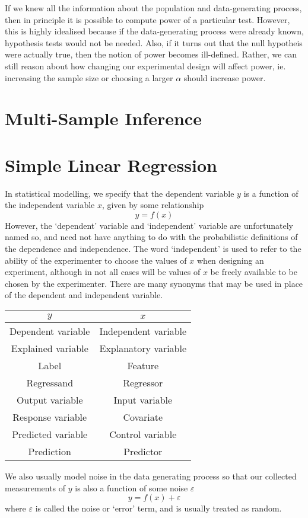 \documentclass[11pt]{report} %
\begin{document}
If we knew all the information about the population and data-generating process, then in principle it is possible to compute power of a particular test. However, this is highly idealised because if the data-generating process were already known, hypothesis tests would not be needed. Also, if it turns out that the null hypotheis were actually true, then the notion of power becomes ill-defined. Rather, we can still reason about how changing our experimental design will affect power, ie. increasing the sample size or choosing a larger $\alpha$ should increase power.

\section{Multi-Sample Inference}

\section{Simple Linear Regression}

In statistical modelling, we specify that the dependent variable $y$ is a function of the independent variable $x$, given by some relationship
\begin{equation}
y = f\left(x\right)
\end{equation}
However, the `dependent' variable and `independent' variable are unfortunately named so, and need not have anything to do with the probabilistic definitions of the dependence and independence. The word `independent' is used to refer to the ability of the experimenter to choose the values of $x$ when designing an experiment, although in not all cases will be values of $x$ be freely available to be chosen by the experimenter. There are many synonyms that may be used in place of the dependent and independent variable.

\begin{table}[H]\centering
\begin{tabular}{|c|c|}
\hline 
$y$ & $x$ \\
\hline 
\hline 
Dependent variable & Independent variable \\
Explained variable & Explanatory variable \\
Label & Feature \\
Regressand & Regressor \\
Output variable & Input variable \\
Response variable & Covariate \\
Predicted variable & Control variable \\
Prediction & Predictor \\
\hline
\end{tabular}
\end{table}
We also usually model noise in the data generating process so that our collected measurements of $y$ is also a function of some noise $\varepsilon$
\begin{equation}
y = f\left(x\right) + \varepsilon
\end{equation}
where $\varepsilon$ is called the noise or `error' term, and is usually treated as random.
\end{document}
